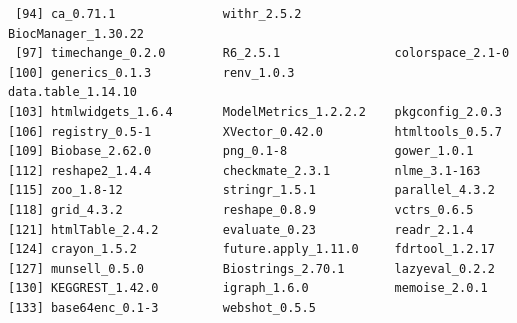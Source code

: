 \documentclass{amsart}
\begin{document}
\begin{verbatim}
 [94] ca_0.71.1               withr_2.5.2             BiocManager_1.30.22
 [97] timechange_0.2.0        R6_2.5.1                colorspace_2.1-0
[100] generics_0.1.3          renv_1.0.3              data.table_1.14.10
[103] htmlwidgets_1.6.4       ModelMetrics_1.2.2.2    pkgconfig_2.0.3
[106] registry_0.5-1          XVector_0.42.0          htmltools_0.5.7
[109] Biobase_2.62.0          png_0.1-8               gower_1.0.1
[112] reshape2_1.4.4          checkmate_2.3.1         nlme_3.1-163
[115] zoo_1.8-12              stringr_1.5.1           parallel_4.3.2
[118] grid_4.3.2              reshape_0.8.9           vctrs_0.6.5
[121] htmlTable_2.4.2         evaluate_0.23           readr_2.1.4
[124] crayon_1.5.2            future.apply_1.11.0     fdrtool_1.2.17 
[127] munsell_0.5.0           Biostrings_2.70.1       lazyeval_0.2.2 
[130] KEGGREST_1.42.0         igraph_1.6.0            memoise_2.0.1 
[133] base64enc_0.1-3         webshot_0.5.5
\end{verbatim}
\end{document}

